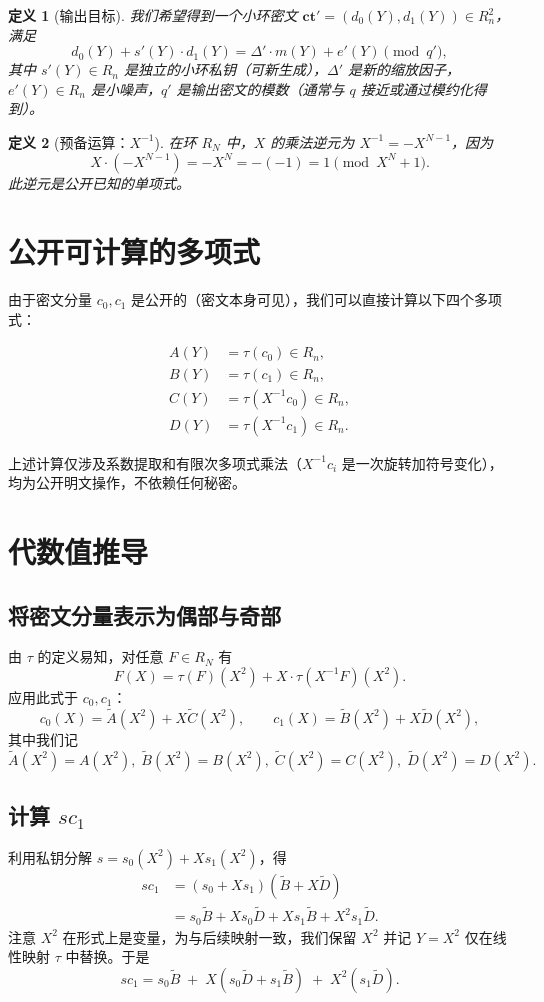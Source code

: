 \documentclass{article}
\newtheorem{definition}{定义}
\begin{document}
\begin{definition}[输出目标]
我们希望得到一个小环密文 $\mathbf{ct}' = (d_0(Y), d_1(Y)) \in R_n^2$，满足
\[
d_0(Y) + s'(Y) \cdot d_1(Y) = \Delta' \cdot m(Y) + e'(Y) \pmod{q'},
\]
其中 $s'(Y) \in R_n$ 是独立的小环私钥（可新生成），$\Delta'$ 是新的缩放因子，$e'(Y) \in R_n$ 是小噪声，$q'$ 是输出密文的模数（通常与 $q$ 接近或通过模约化得到）。
\end{definition}

\begin{definition}[预备运算：$X^{-1}$]
在环 $R_N$ 中，$X$ 的乘法逆元为 $X^{-1} = -X^{N-1}$，因为
\[
X \cdot (-X^{N-1}) = -X^N = -(-1) = 1 \pmod{X^N+1}.
\]
此逆元是公开已知的单项式。
\end{definition}

\section{公开可计算的多项式}

由于密文分量 $c_0, c_1$ 是公开的（密文本身可见），我们可以直接计算以下四个多项式：

\begin{align}
A(Y) &= \tau(c_0) \in R_n, \\
B(Y) &= \tau(c_1) \in R_n, \\
C(Y) &= \tau(X^{-1} c_0) \in R_n, \\
D(Y) &= \tau(X^{-1} c_1) \in R_n.
\end{align}

上述计算仅涉及系数提取和有限次多项式乘法（$X^{-1}c_i$ 是一次旋转加符号变化），均为公开明文操作，不依赖任何秘密。

\section{代数值推导}

\subsection{将密文分量表示为偶部与奇部}
由 $\tau$ 的定义易知，对任意 $F \in R_N$ 有
\[
F(X) = \tau(F)(X^2) + X \cdot \tau(X^{-1}F)(X^2).
\]
应用此式于 $c_0, c_1$：
\[
c_0(X) = \tilde{A}(X^2) + X \tilde{C}(X^2), \qquad
c_1(X) = \tilde{B}(X^2) + X \tilde{D}(X^2),
\]
其中我们记
\[
\tilde{A}(X^2)=A(X^2),\;\tilde{B}(X^2)=B(X^2),\;
\tilde{C}(X^2)=C(X^2),\;\tilde{D}(X^2)=D(X^2).
\]

\subsection{计算 $s c_1$}
利用私钥分解 $s = s_0(X^2) + X s_1(X^2)$，得
\begin{align}
s c_1 &= (s_0 + X s_1)(\tilde{B} + X \tilde{D}) \\
&= s_0\tilde{B} + X s_0\tilde{D} + X s_1\tilde{B} + X^2 s_1\tilde{D}.
\end{align}
注意 $X^2$ 在形式上是变量，为与后续映射一致，我们保留 $X^2$ 并记 $Y = X^2$ 仅在线性映射 $\tau$ 中替换。于是
\[
s c_1 = s_0\tilde{B} \;+\; X(s_0\tilde{D} + s_1\tilde{B}) \;+\; X^2 (s_1\tilde{D}).
\]
\end{document}
